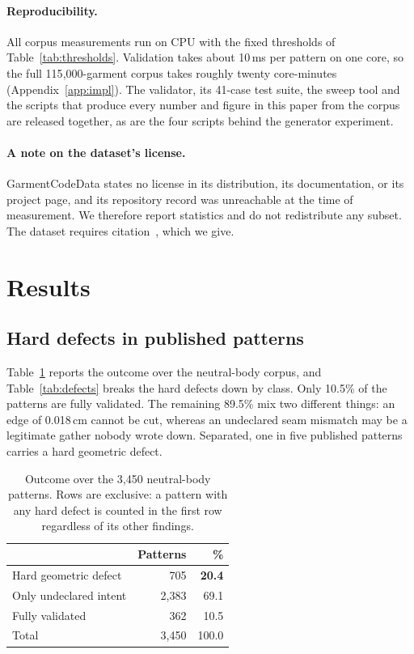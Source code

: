 \documentclass[10pt,twocolumn]{article}
\begin{document}
\paragraph{Reproducibility.} All corpus measurements run on CPU with the fixed
thresholds of Table~\ref{tab:thresholds}. Validation takes about 10\,ms per
pattern on one core, so the full 115{,}000-garment corpus takes roughly twenty
core-minutes (Appendix~\ref{app:impl}). The validator, its 41-case test suite,
the sweep tool and the scripts that produce every number and figure in this
paper from the corpus are released together, as are the four scripts behind
the generator experiment.

\paragraph{A note on the dataset's license.} GarmentCodeData states no license
in its distribution, its documentation, or its project page, and its repository
record was unreachable at the time of measurement. We therefore report
statistics and do not redistribute any subset. The dataset requires
citation~\citep{gcdata}, which we give.

\section{Results}

\subsection{Hard defects in published patterns}
\label{sec:res-gap}

Table~\ref{tab:breakdown} reports the outcome over the neutral-body corpus, and
Table~\ref{tab:defects} breaks the hard defects down by class.
Only 10.5\% of the patterns are fully validated. The remaining 89.5\% mix two
different things: an edge of 0.018\,cm cannot be cut, whereas an undeclared
seam mismatch may be a legitimate gather nobody wrote down. Separated, one in
five published patterns carries a hard geometric defect.

\begin{table}[t]
\centering
\begin{tabular}{lrr}
\toprule
& Patterns & \% \\
\midrule
Hard geometric defect & 705 & \textbf{20.4} \\
Only undeclared intent & 2{,}383 & 69.1 \\
Fully validated & 362 & 10.5 \\
\midrule
Total & 3{,}450 & 100.0 \\
\bottomrule
\end{tabular}
\caption{Outcome over the 3{,}450 neutral-body patterns. Rows are exclusive: a
pattern with any hard defect is counted in the first row regardless of its
other findings.}
\label{tab:breakdown}
\end{table}
\end{document}
